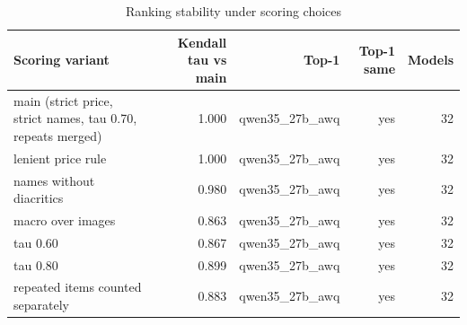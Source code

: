 \begin{table}[t]
\centering
\caption{Ranking stability under scoring choices}
\label{tab:sensitivity}
\small
\begin{tabular}{lrrrr}
\toprule
Scoring variant & Kendall tau vs main & Top-1 & Top-1 same & Models \\
\midrule
main (strict price, strict names, tau 0.70, repeats merged) & 1.000 & qwen35\_27b\_awq & yes & 32 \\
lenient price rule & 1.000 & qwen35\_27b\_awq & yes & 32 \\
names without diacritics & 0.980 & qwen35\_27b\_awq & yes & 32 \\
macro over images & 0.863 & qwen35\_27b\_awq & yes & 32 \\
tau 0.60 & 0.867 & qwen35\_27b\_awq & yes & 32 \\
tau 0.80 & 0.899 & qwen35\_27b\_awq & yes & 32 \\
repeated items counted separately & 0.883 & qwen35\_27b\_awq & yes & 32 \\
\bottomrule
\end{tabular}
\end{table}
